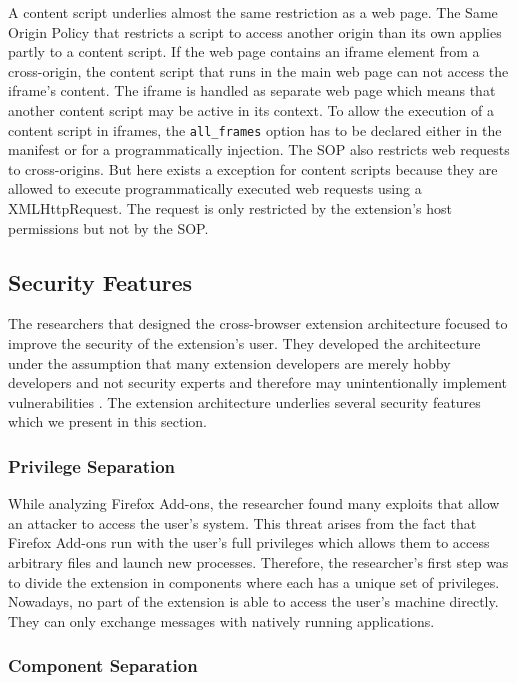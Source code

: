 	A content script underlies almost the same restriction as a web page. The Same Origin Policy that restricts a script to access another origin than its own applies partly to a content script. If the web page contains an iframe element from a cross-origin, the content script that runs in the main web page can not access the iframe's content. The iframe is handled as separate web page which means that another content script may be active in its context. To allow the execution of a content script in iframes, the \texttt{all\_frames} option has to be declared either in the manifest or for a programmatically injection. The SOP also restricts web requests to cross-origins. But here exists a exception for content scripts because they are allowed to execute programmatically executed web requests using a XMLHttpRequest. The request is only restricted by the extension's host permissions but not by the SOP. 

\subsection{Security Features}

	The researchers that designed the cross-browser extension architecture focused to improve the security of the extension's user. They developed the architecture under the assumption that many extension developers are merely hobby developers and not security experts and therefore may unintentionally implement vulnerabilities \cite{Barth10protectingbrowsers}. The extension architecture underlies several security features which we present in this section.
	
\subsubsection{Privilege Separation}

	While analyzing Firefox Add-ons, the researcher found many exploits that allow an attacker to access the user's system. This threat arises from the fact that Firefox Add-ons run with the user's full privileges which allows them to access arbitrary files and launch new processes. Therefore, the researcher's first step was to divide the extension in components where each has a unique set of privileges. Nowadays, no part of the extension is able to access the user's machine directly. They can only exchange messages with natively running applications. 
		
\subsubsection{Component Separation}

